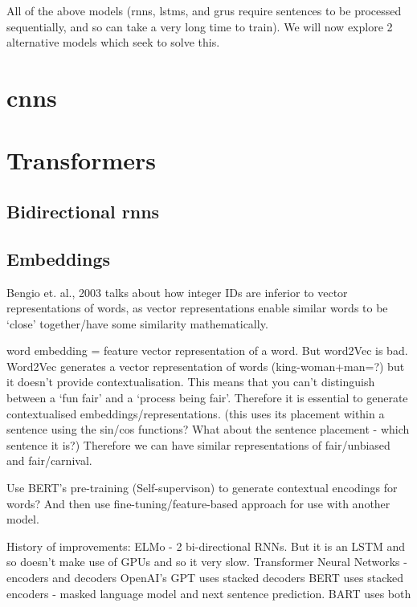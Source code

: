 All of the above models (\acrshort{rnn}s, \acrshort{lstm}s, and \acrshort{gru}s require sentences to be processed sequentially, and so can take a very long time to train). We will now explore 2 alternative models which seek to solve this.

\section{\acrlong{cnn}s}
\label{sec:background_cnns}


\section{Transformers}
\label{sec:background_transformers}

\subsection{Bidirectional \acrshort{rnn}s}
\subsection{Embeddings}
Bengio et. al., 2003 talks about how integer IDs are inferior to vector representations of words, as vector representations enable similar words to be `close' together/have some similarity mathematically.

word embedding = feature vector representation of a word. But word2Vec is bad. Word2Vec generates a vector representation of words (king-woman+man=?) but it doesn't provide contextualisation. This means that you can't distinguish between a `fun fair' and a `process being fair'. Therefore it is essential to generate contextualised embeddings/representations. (this uses its placement within a sentence using the sin/cos functions? What about the sentence placement - which sentence it is?) Therefore we can have similar representations of fair/unbiased and fair/carnival.

Use BERT's pre-training (Self-supervison) to generate contextual encodings for words? And then use fine-tuning/feature-based approach for use with another model.






History of improvements: 
ELMo - 2 bi-directional RNNs. But it is an LSTM and so doesn't make use of GPUs and so it very slow.
Transformer Neural Networks - encoders and decoders
OpenAI's GPT uses stacked decoders
BERT uses stacked encoders - masked language model and next sentence prediction.
BART uses both

